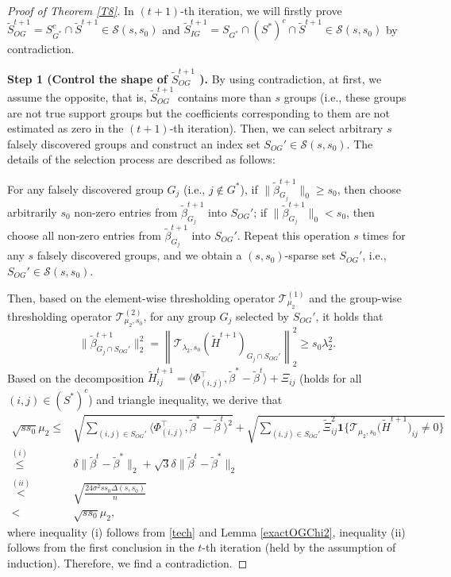 \documentclass[12pt]{article}
\newtheorem{proof}{Proof}
\begin{document}
\begin{appendix}
\begin{proof}[Proof of Theorem \ref{T8}]
In $(t+1)$-th iteration, we will firstly prove $ \tilde S_{OG}^{t+1} = S_{G^*}^c \cap \tilde S^{t+1} \in \mathcal S(s,s_0) $ and $ \tilde S_{IG}^{t+1} = S_{G^*} \cap (S^*)^c \cap \tilde S^{t+1} \in \mathcal S (s,s_0 ) $ by  contradiction.

\textbf{Step 1 (Control the shape of $ \tilde S_{OG}^{t+1}$ ).} 
By using contradiction, at first, we assume the opposite, that is, $ \tilde S_{OG}^{t+1} $ contains more than $s$ groups (i.e., these groups are not true support groups but the coefficients corresponding to them are not estimated as zero in the $(t+1)$-th iteration). 
Then, we can select arbitrary $s$ falsely discovered groups and construct an index set $S_{OG}' \in \mathcal S (s,s_0)$. The details of the selection process are described as follows:

For any falsely discovered group $G_j$ (i.e., $j \notin G^*$), if $\|\tilde \beta_{G_j}^{t+1}  \|_0 \ge s_0$, then choose arbitrarily $s_0$ non-zero entries from $\tilde \beta_{G_j}^{t+1}$ into $S_{OG}'$;
if $\|\tilde \beta_{G_j}^{t+1}  \|_0 < s_0$, then choose all non-zero entries from $\tilde \beta_{G_j}^{t+1}$ into $S_{OG}'$.
Repeat this operation $s$ times for any $s$ falsely discovered groups, and we obtain a $(s, s_0)$-sparse set $S_{OG}'$, i.e., $S_{OG}' \in \mathcal S(s,s_0)$.

Then, based on the element-wise thresholding operator $\mathcal T_{\mu_2}^{(1)}$ and the group-wise thresholding operator $\mathcal T_{\mu_2,s_0}^{(2)}$, for any group $G_j$ selected by $S_{OG}'$, it holds that 
$$\| \tilde \beta_{G_j \cap S_{OG}'}^{t+1} \|_2^2 
= \left\| \mathcal T_{\lambda_2,s_0}\left(\tilde H^{t+1} \right)_{G_j \cap S_{OG}'} \right\|_2^2 
\ge s_0 \lambda_{2}^2.$$
Based on the decomposition $\tilde H^{t+1}_{ij}
 =  \langle{\Phi}_{(i,j)}^\top,\tilde \beta^*- \tilde \beta^{t}\rangle +  \Xi_{ij}$ (holds for all $ (i,j) \in (S^*)^c$) and triangle inequality, we derive that
\begin{equation}\label{exactOG}
    \begin{aligned}
    \sqrt{ ss_0 }\mu_2
    \le& \sqrt{\sum_{(i,j) \in S_{OG}'} \langle{\Phi}_{(i,j)}^\top, \tilde\beta^* - \tilde\beta^{t} \rangle^2 } 
        + \sqrt{\sum_{(i,j) \in S_{OG}'}  \tilde\Xi_{ij}^2 \mathbf1\Big\{ \mathcal T_{\mu_{2},s_0} 
    \big(\tilde H^{t+1}\big)_{ij}\ne 0\Big\} }\\
    \overset{(i)}{\le} & \delta \|\tilde \beta^t - \tilde\beta^* \|_2 +  \sqrt3 \delta \|\tilde \beta^t - \tilde\beta^* \|_2\\
  \overset{(ii)}{<}& \sqrt{\frac{24\sigma^2 ss_0 \Delta(s,s_0)}{n}}\\
  <& \sqrt{ ss_0 }\mu_2 ,
\end{aligned}
\end{equation}
where inequality (i) follows from \eqref{tech} and Lemma \ref{exactOGChi2}, inequality (ii) follows from the first conclusion in the $t$-th iteration (held by the assumption of induction).
Therefore, we find a contradiction.


\end{proof}
\end{appendix}
\end{document}
